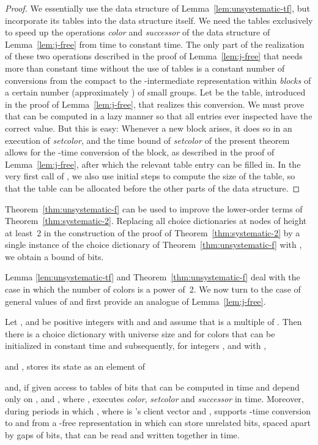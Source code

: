 \documentclass[envcountsame,envcountsect,undated,nolinenumbers]{lnthi}
\def\Tvn#1{\hbox{\textit{#1\/}}}
\begin{document}
\begin{proof}
We essentially use the data structure of
Lemma~\ref{lem:unsystematic-tf}, but
incorporate its tables 
into the data structure itself.
We need the tables exclusively to speed
up the operations \Tvn{color} and \Tvn{successor}
of the data structure of Lemma~\ref{lem:j-free}
from  time to constant time.
The only part of the realization of these two
operations described in the proof of
Lemma~\ref{lem:j-free} that needs more than
constant time without the use of
tables is a constant number of conversions
from the compact to the -intermediate representation
within \emph{blocks}
of a certain number (approximately
) of small groups.
Let  be the table, introduced in the proof of
Lemma~\ref{lem:j-free}, that realizes this conversion. We must prove
that  can
be computed in a lazy manner so that all
entries ever inspected have the correct value.
But this is easy:
Whenever a new block arises, it does
so in an execution of \Tvn{setcolor}, and the
time bound of \Tvn{setcolor} of
the present theorem allows for the
-time conversion of the block,
as described in the proof of Lemma~\ref{lem:j-free},
after which the relevant table entry can be filled in.
In the very first call of ,
we also use  initial steps to compute
the size of the table, so that the table can
be allocated before the other parts of the
data structure.
\end{proof}

Theorem~\ref{thm:unsystematic-f} can be
used to improve the lower-order terms of
Theorem~\ref{thm:systematic-2}.
Replacing all choice dictionaries at nodes of
height at least~2 in the construction of the proof of
Theorem~\ref{thm:systematic-2} by a single
instance of the choice dictionary of
Theorem~\ref{thm:unsystematic-f} with ,
we obtain a bound of
 bits.

Lemma \ref{lem:unsystematic-tf}
and Theorem~\ref{thm:unsystematic-f}
deal with the case in which the number  of colors
is a power of~2.
We now turn to the case of general values of 
and first provide an analogue of
Lemma~\ref{lem:j-free}.

\begin{lemma}
\label{lem:j-free-c}Let ,  and  be positive integers
with  and 
and assume that  is a multiple of .
Then there is a choice dictionary  with universe size
 and for  colors that can be initialized
in constant time and subsequently,
for integers ,  and  with ,

and , stores its
state as an element of

and, if given access to tables of
 bits that can be computed in
 time and depend only on ,  and ,
where ,
executes
\Tvn{color}, \Tvn{setcolor} and
\Tvn{successor} in  time.
Moreover, during periods in which
, where 
is 's client vector and ,
 supports -time conversion to and from
a -free representation in which  can
store  unrelated bits, spaced apart by
gaps of  bits, that can be
read and written together in  time.
\end{lemma}
\end{document}
